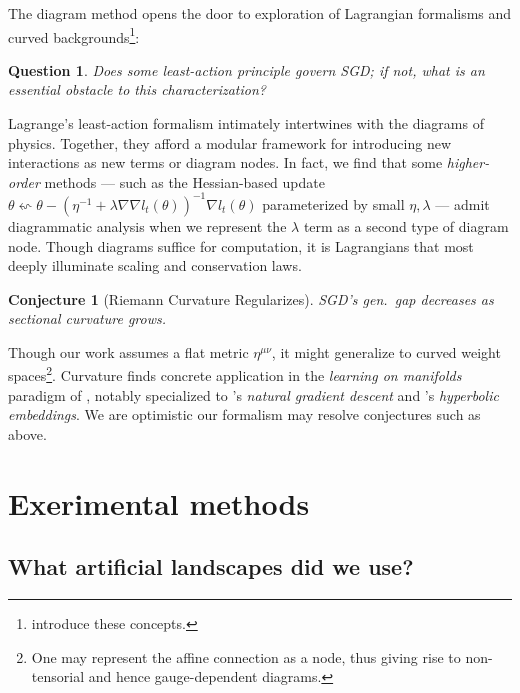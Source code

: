 \documentclass{article}
\theoremstyle{plain}
\newtheorem{conj}{Conjecture}
\newtheorem{quest}{Question}
\theoremstyle{definition}
\begin{document}
        The diagram method opens the door to exploration of Lagrangian
        formalisms and curved backgrounds\footnote{
            \cite{la60, la51} introduce these concepts.
        }:
        \begin{quest}
            Does some least-action principle govern SGD; if not, what is an
            essential obstacle to this characterization?
        \end{quest}
        Lagrange's least-action formalism intimately intertwines with the
        diagrams of physics.  Together, they afford a modular framework for
        introducing new interactions as new terms or diagram nodes.  In fact,
        we find that some \emph{higher-order} methods --- such as the
        Hessian-based update
        $
            \theta \leftsquigarrow
            \theta -
            (\eta^{-1} + \lambda \nabla \nabla l_t(\theta))^{-1}
            \nabla l_t(\theta)
        $
        parameterized by small $\eta, \lambda$ --- admit diagrammatic analysis
        when we represent the $\lambda$ term as a second type of diagram node.
        Though diagrams suffice for computation, it is Lagrangians that most
        deeply illuminate scaling and conservation laws.
        \begin{conj}[Riemann Curvature Regularizes]
            SGD's gen.\ gap decreases as sectional curvature grows. 
        \end{conj}
        Though our work assumes a flat metric $\eta^{\mu\nu}$, it might
        generalize to curved weight spaces\footnote{
            One may represent the affine connection as a node, thus giving
            rise to non-tensorial and hence gauge-dependent diagrams.
        }.
        Curvature finds concrete application in the \emph{learning on
        manifolds} paradigm of \cite{ab07, zh16}, notably specialized to
        \cite{am98}'s \emph{natural gradient descent} and \cite{ni17}'s
        \emph{hyperbolic embeddings}.  We are optimistic our formalism may
        resolve conjectures such as above.


\section{Exerimental methods}\label{appendix:experiments}

    \subsection{What artificial landscapes did we use?}             \label{appendix:artificial}
\end{document}
